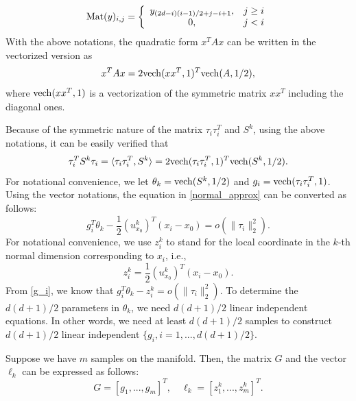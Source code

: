 \documentclass{article}
\theoremstyle{remark}
\begin{document}
\[
{\rm Mat} (y) _{i,j} =\left\{
\begin{array}{cc}
 y_{{(2d-i)(i-1)}/{2}+j-i+1},& j\geq i\\
 0,& j<i
\end{array}
 \right.
\]
With the above notations, the quadratic form $x^T A x$ can be written in the vectorized version as
\[
x^T A x = 2{\rm vech}(xx^T,1)^T {\rm vech}(A,1/2),
\]
where ${\rm vech}(xx^T,1)$ is a vectorization of the symmetric matrix $xx^T$ including the diagonal ones.




Because of the symmetric nature of the matrix $\tau_i\tau_i^T$ and $S^k$, using the above notations, it can be easily verified that
\[
\tau_i^TS^k\tau_i = \langle \tau_i\tau_i^T, S^k\rangle =2{\rm vech}(\tau_i\tau_i^T,1)^T {\rm vech}(S^k,1/2).%
\]
For notational convenience, we let $\theta_k = {\rm vech}(S^k,1/2)$ and $g_i = {\rm vech}(\tau_i\tau_i^T,1)$.
Using the vector notations, the equation in \eqref{normal_approx} can be converted as follows:
\begin{equation}\label{g_i}
g_i^T \theta_k  - \frac{1}{2}{(u^k_{x_0})}^T (x_i -x_0) = o(\|\tau_i\|_2^2).
\end{equation}
For notational convenience, we use $z_i^k$ to stand for the local coordinate in the $k$-th normal dimension corresponding to $x_i$, i.e.,
\[
z_i^k =  \frac{1}{2}{(u^k_{x_0})}^T (x_i -x_0). %
\] 
From \eqref{g_i}, we know that
$
g_i^T \theta_k  - z_i^k= o(\|\tau_i\|_2^2).
$
To determine the ${d(d+1)}/{2}$ parameters in $\theta_k$, we need ${d(d+1)}/{2}$ linear independent equations. In other words, we need at least ${d(d+1)}/{2}$ samples to construct ${d(d+1)}/{2}$ linear independent $\{g_i, i = 1,...,{d(d+1)}/{2}\}$. 

Suppose we have $m$ samples on the manifold. Then, the matrix $G$ and the vector $\ell_k$ can be expressed as follows:
\[
G = [g_1,...,g_m]^T, \quad \ell_k = [z_1^k,..., z^k_m ]^T.
\]
\end{document}
